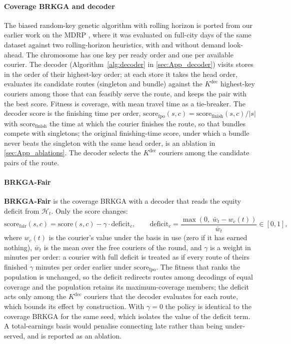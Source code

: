\documentclass[a4paper,11pt,review,3p,authoryear]{elsarticle}
\newcommand{\Hist}{\mathcal{H}}
\begin{document}
\paragraph{Coverage BRKGA and decoder} The biased random-key genetic algorithm \citep{goncalves2011biased} with rolling horizon is ported from our earlier work on the MDRP \citep{giraldo2026brkga}, where it was evaluated on full-city days of the same dataset against two rolling-horizon heuristics, with and without demand look-ahead. The chromosome has one key per ready order and one per available courier. The decoder (Algorithm~\ref{alg:decoder} in \ref{sec:App_decoder}) visits stores in the order of their highest-key order; at each store it takes the head order, evaluates its candidate routes (singleton and bundle) against the $K^{\text{dec}}$ highest-key couriers among those that can feasibly serve the route, and keeps the pair with the best score. Fitness is coverage, with mean travel time as a tie-breaker. The decoder score is the finishing time per order, $\text{score}_{\text{fpo}}(s, c) = \text{score}_{\text{finish}}(s, c)/|s|$ with $\text{score}_{\text{finish}}$ the time at which the courier finishes the route, so that bundles compete with singletons; the original finishing-time score, under which a bundle never beats the singleton with the same head order, is an ablation in \ref{sec:App_ablations}. The decoder selects the $K^{\text{dec}}$ couriers among the candidate pairs of the route.

\paragraph{BRKGA-Fair}
\label{sec:brkgafair}
\textbf{BRKGA-Fair} is the coverage BRKGA with a decoder that reads the equity deficit from $\Hist_t$. Only the score changes:
\begin{equation}
\text{score}_{\text{fair}}(s, c) = \text{score}(s, c) - \gamma \cdot \text{deficit}_c, \qquad
\text{deficit}_c = \frac{\max(0,\; \bar w_t - w_c(t))}{\bar w_t} \in [0,1],
\label{eqn:brkgafair}
\end{equation}
where $w_c(t)$ is the courier's value under the basis in use (zero if it has earned nothing), $\bar w_t$ is the mean over the free couriers of the round, and $\gamma$ is a weight in minutes per order: a courier with full deficit is treated as if every route of theirs finished $\gamma$ minutes per order earlier under $\text{score}_{\text{fpo}}$. The fitness that ranks the population is unchanged, so the deficit redirects routes among decodings of equal coverage and the population retains its maximum-coverage members; the deficit acts only among the $K^{\text{dec}}$ couriers that the decoder evaluates for each route, which bounds its effect by construction. With $\gamma = 0$ the policy is identical to the coverage BRKGA for the same seed, which isolates the value of the deficit term. A total-earnings basis would penalise connecting late rather than being under-served, and is reported as an ablation.
\end{document}
